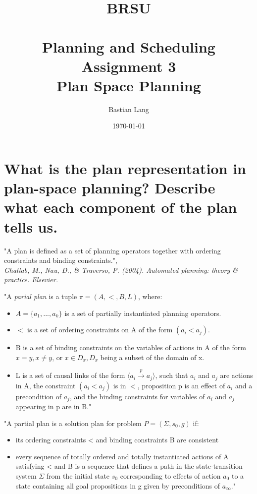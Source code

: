 \documentclass[paper=a4, fontsize=11pt]{scrartcl} %
\title{	
\normalfont \normalsize 
\textsc{BRSU} \\ [25pt] %
\horrule{0.5pt} \\[0.4cm] %
\huge Planning and Scheduling\\Assignment 3 \\
Plan Space Planning %
\horrule{2pt} \\[0.5cm] %
}
\author{Bastian Lang} %
\date{\normalsize\today} %
\numberwithin{equation}{section} %
\numberwithin{figure}{section} %
\numberwithin{table}{section} %
\begin{document}
\maketitle %

\section{What is the plan representation in plan-space planning? Describe what each component
of the plan tells us.}

"A plan is defined as a set of planning operators together with ordering constraints and binding constraints.",\\
\textit{Ghallab, M., Nau, D., \& Traverso, P. (2004). Automated planning: theory \& practice. Elsevier.}\vspace{5mm}

"A \textit{parial plan} is a tuple $\pi=(A,<,B,L)$, where:
\begin{itemize}
	\item $A = \{a_1, ..., a_k\}$ is a set of partially instantiated planning operators.
	\item $<$ is a set of ordering constraints on A of the form $(a_i < a_j).$
	\item B is a set of binding constraints on the variables of actions in A of the form $x=y, x\neq y$, or $x\in D_x, D_x$ being a subset of the domain of x.
	\item L is a set of causal links of the form $\langle a_i \overset{p}{\rightarrow} a_j \rangle$, such that $a_i$ and $a_j$ are actions in A, the constraint $(a_i<a_j)$ is in $<$, proposition p is an effect of $a_i$ and a precondition of $a_j$, and the binding constraints for variables of $a_i$ and $a_j$ appearing in p are in B."
\end{itemize}

"A partial plan is a solution plan for problem $P = (\Sigma, s_0, g)$ if:
\begin{itemize}
	\item its ordering constraints < and binding constraints B are consistent
	\item every sequence of totally ordered and totally instantiated actions of A satisfying < and B is a sequence that defines a path in the state-transition system $\Sigma$ from the initial state $s_0$ corresponding to effects of action $a_0$ to a state containing all goal propositions in g given by preconditions of $a_{\infty}$."
\end{itemize}
\end{document}
